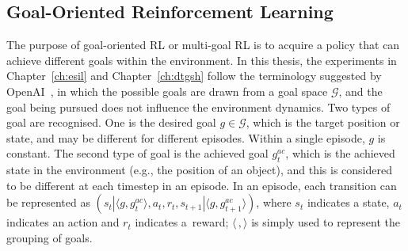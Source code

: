 \subsection{Goal-Oriented Reinforcement Learning}
\label{ch3:goal_rl}
The purpose of goal-oriented RL or multi-goal RL is to acquire a policy that can achieve different goals within the environment. 
In this thesis, the experiments in Chapter~\ref{ch:esil} and Chapter~\ref{ch:dtgsh} follow the terminology suggested by OpenAI~\cite{plappert2018multi}, in which the possible goals are drawn from a goal space $\mathcal{G}$, and the goal being pursued does not influence the environment dynamics. Two types of goal are recognised. One is the desired goal $g\in \mathcal{G}$, which is the target position {or state}, and may be different for different episodes. Within a single episode, $g$ is constant.  The second type of goal is the achieved goal $g^{ac}_{t}$, which is the achieved state in the environment (e.g., the position of an object), and this is considered to be different at each timestep in an episode. In an episode, each transition can be represented as $(s_t|\langle g, g^{ac}_{t} \rangle, a_t, r_t, s_{t+1}|\langle g, g^{ac}_{t+1} \rangle)$, where $s_t$ indicates a state, $a_t$ indicates an action and $r_t$ indicates a~reward; $\langle \, , \rangle$ is simply used to represent the grouping of goals.

